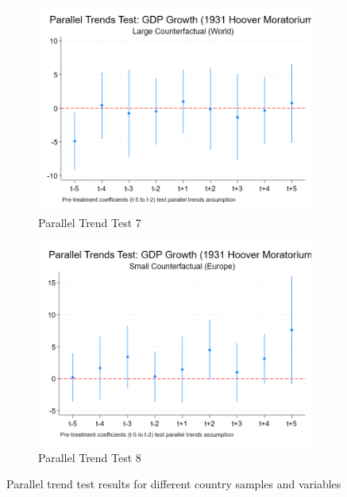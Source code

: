 \begin{figure}[ht!]
\begin{subfigure}[b]{0.48\textwidth}
        \includegraphics[width=\textwidth]{figures/PT_GDP_1931_Large.png}
        \caption{Parallel Trend Test 7}
        \label{fig:pt7}
    \end{subfigure}
    \hfill
    \begin{subfigure}[b]{0.48\textwidth}
        \centering
        \includegraphics[width=\textwidth]{figures/PT_GDP_1931_Small.png}
        \caption{Parallel Trend Test 8}
        \label{fig:pt8}
    \end{subfigure}
    \caption{Parallel trend test results for different country samples and variables}
    \label{fig:parallel_trends}
\end{figure}

